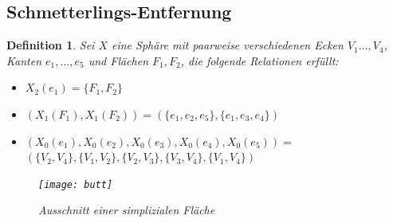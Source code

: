 \documentclass[12pt,titlepage,twoside,cleardoublepage]{article}
\theoremstyle{nummermitklammern}
\newtheorem{definition}[temp]{Definition}
\newtheorem{definition}[zahl]{Definition}
\numberwithin{equation}{section}
\begin{document}
  \subsection{Schmetterlings-Entfernung}
 \begin{definition}
 Sei $X$ eine Sphäre mit paarweise verschiedenen Ecken $V_1\ldots ,V_4$, Kanten $e_1,\ldots,e_5$ und Flächen $F_1,F_2$,
 die folgende Relationen erfüllt: 
 \begin{itemize}
 \item $X_2(e_1)=\{F_1,F_2\}$
  \item $(X_1(F_1),X_1(F_2))=(\{e_1,e_2,e_5\},\{e_1,e_3,e_4\})$
 \item   $(X_0(e_1),X_0(e_2),X_0(e_3),X_0(e_4),X_0(e_5)) =$ \\$ (\{V_2,V_4\},\{V_1,V_2\},\{V_2,V_3\},\{V_3,V_4\},\{V_1,V_4\})$
\end{itemize}  

\begin{figure}[H]
\begin{center}
\texttt{[image: butt]}
\end{center}
\caption{Ausschnitt einer simplizialen Fläche}
\end{figure}


\end{definition}
\end{document}
